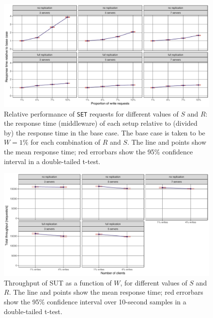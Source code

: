 \documentclass[11pt]{article}
\newcommand{\set}[0]{\texttt{SET}}
\begin{document}
\begin{figure}[h]
\centering
\includegraphics[width=\textwidth]{../results/writes/graphs/relative_performance_set.pdf}
\caption{Relative performance of \set{} requests for different values of $S$ and $R$: the response time (middleware) of each setup relative to (divided by) the response time in the base case. The base case is taken to be $W=1\%$ for each combination of $R$ and $S$.
The line and points show the mean response time; red errorbars show the 95\% confidence interval in a double-tailed t-test.}
\label{fig:exp3:res:relative:set}
\end{figure}

\begin{figure}[h]
\centering
\includegraphics[width=\textwidth]{../results/writes/graphs/throughput_vs_writes.pdf}
\caption{Throughput of SUT as a function of $W$, for different values of $S$ and $R$. The line and points show the mean response time; red errorbars show the 95\% confidence interval over 10-second samples in a double-tailed t-test.}
\label{fig:exp3:res:throughput}
\end{figure}
\end{document}
